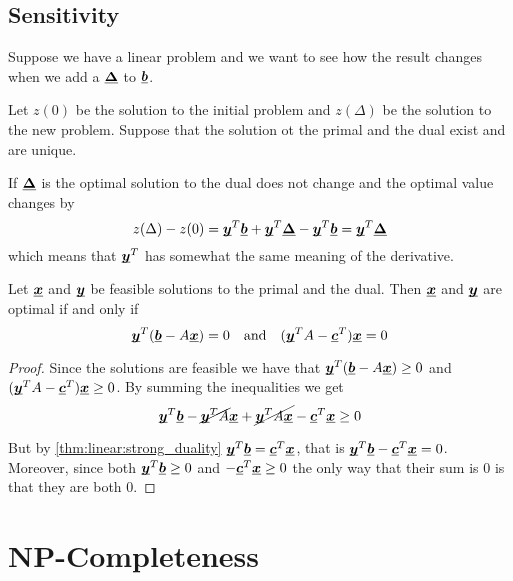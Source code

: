 \documentclass[12pt]{extarticle}
\renewcommand{\vec}[1]{\uvec{#1}}
\begin{document}
\subsection{Sensitivity}

Suppose we have a linear problem and we want to see how the result changes when we add a $\vec \Delta$ to $\vec b$.

Let $z(0)$ be the solution to the initial problem and $z(\Delta)$ be the solution to the new problem.
Suppose that the solution ot the primal and the dual exist and are unique.

If $\vec \Delta$ is  the optimal solution to the dual does not change and the optimal value changes by
\begin{equation}
    z(\Delta) - z(0) = \vec y^T \vec b + \vec y^T \vec \Delta - \vec y^T \vec b = \vec y^T \vec \Delta
\end{equation}
which means that $\vec y^T$ has somewhat the same meaning of the derivative.

\begin{theorem}
    Let $\vec x$ and $\vec y$ be feasible solutions to the primal and the dual.
    Then $\vec x$ and $\vec y$ are optimal if and only if
    \begin{equation}
        \vec y^T (\vec b - A \vec x) = 0 \quad \text{and} \quad (\vec y^T A - \vec c^T) \vec x = 0
    \end{equation}
\end{theorem}

\begin{proof}
    Since the solutions are feasible we have that $\vec y^T (\vec b - A \vec x) \geq 0$ and $(\vec y^T A - \vec c^T) \vec x \geq 0$.
    By summing the inequalities we get
    \begin{equation}
        \vec y^T \vec b - \cancel{\vec y^T A} \vec x + \cancel{\vec y^T A \vec x} - \vec c^T \vec x \geq 0
    \end{equation}

    But by \autoref{thm:linear:strong_duality} $\vec y^T \vec b = \vec c^T \vec x$, that is $\vec y^T \vec b - \vec c^T \vec x = 0$.
    Moreover, since both $\vec y^T \vec b \geq 0$ and $-\vec c^T \vec x \geq 0$ the only way that their sum is $0$ is that they are both $0$.
\end{proof}

\section{NP-Completeness}
\end{document}
